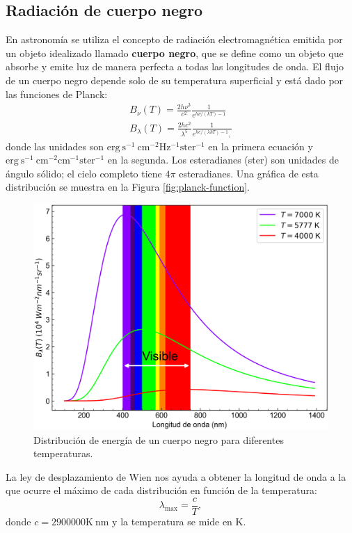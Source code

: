 \subsection{Radiación de cuerpo negro}
En astronomía se utiliza el concepto de radiación electromagnética emitida por un objeto idealizado llamado \textbf{cuerpo negro}, que se define como un objeto que absorbe y emite luz de manera perfecta a todas las longitudes de onda. El flujo de un cuerpo negro depende solo de su temperatura superficial y está dado por las funciones de Planck:
\begin{align*}
  B_{\nu}(T) = \frac{2 h \nu^3}{c^2} \frac{1}{e^{h\nu/(kT) -1}} \\
  B_{\lambda}(T) = \frac{2hc^2}{\lambda^5}\frac{1}{e^{hc/(\lambda kT) -1},}
\end{align*}
donde las unidades son $ \mathrm{erg ~ s^{-1} ~ cm^{-2} Hz^{-1} ster^{-1}} $ en la primera ecuación y $ \mathrm{erg ~ s^{-1} ~ cm^{-2} cm^{-1} ster^{-1}} $ en la segunda. Los esteradianes (ster) son unidades de ángulo sólido; el cielo completo tiene $ 4\pi $ esteradianes. Una gráfica de esta distribución se muestra en la Figura \ref{fig:planck-function}.

\begin{figure}[htb]
  \centering
				\includegraphics[width=\textwidth]{figures/Black_body.png}
				\caption{Distribución de energía de un cuerpo negro para diferentes temperaturas.}
				\label{fig:placnk-function} 
\end{figure}

La ley de desplazamiento de Wien nos ayuda a obtener la longitud de onda a la que ocurre el máximo de cada distribución en función de la temperatura:
\[ \lambda_{\mathrm{\max}} = \frac{c}{T}, \]
donde $ c = 2900000 \mathrm{K ~ nm} $ y la temperatura se mide en $ \mathrm{K} $. 
